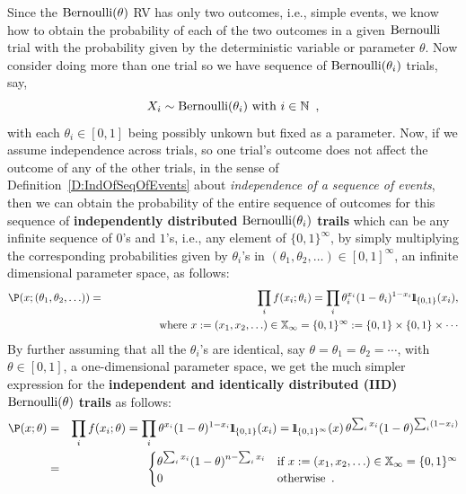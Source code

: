 Since the $\mbox{{\rm Bernoulli}}(\theta)$ RV has only two outcomes, i.e., simple events, we know how to obtain the probability of each of the two outcomes in a given $\mbox{{\rm Bernoulli}}$ trial with the probability given by the deterministic variable or parameter $\theta$. 
Now consider doing more than one trial so we have sequence of $\mbox{{\rm Bernoulli}}(\theta_i)$ trials, say,
\[
X_i \sim \mbox{{\rm Bernoulli}}(\theta_i) \text{ with } i \in \mathbb{N} \enspace ,
\] 
with each $\theta_i \in [0,1]$ being possibly unkown but fixed as a parameter. 
Now, if we assume independence across trials, so one trial's outcome does not affect the outcome of any of the other trials, in the sense of Definition~\ref{D:IndOfSeqOfEvents} 
about \emph{independence of a sequence of events}, then we can obtain the probability of the entire sequence of outcomes for this sequence of \textbf{independently distributed} $\mbox{{\rm Bernoulli}}(\theta_i)$ \textbf{trails} which can be any infinite sequence of $0$'s and $1$'s, i.e., any element of $\{0,1\}^{\infty}$, by simply multiplying the corresponding probabilities given by $\theta_i$'s in $(\theta_1,\theta_2,\ldots) \in [0,1]^{\infty}$, an infinite dimensional parameter space, as follows:
\begin{eqnarray}\label{Eq:probofindependentBernoullithetaiTrials}
\P(x; (\theta_1,\theta_2,\ldots)) &=& \prod_i f(x_i;\theta_i)= \prod_i \theta_i^{x_i} (1-\theta_i)^{1-x_i} \BB{1}_{\{0,1\}}(x_i), \\
&~& \qquad \qquad \text{ where } x:= (x_1,x_2,\ldots) \in \mathbb{X}_{\infty} = \{0,1\}^{\infty} := \{0,1\} \times \{0,1\} \times \cdots \notag
\end{eqnarray}
By further assuming that all the $\theta_i$'s are identical, say $\theta = \theta_1 = \theta_2 = \cdots$, with $\theta \in [0,1]$, a one-dimensional parameter space, we get the much simpler expression for the \textbf{independent and identically distributed (IID)} $\mbox{{\rm Bernoulli}}(\theta)$ \textbf{trails} as follows:
\begin{eqnarray}\label{Eq:probofindependentIdenticalBernoullithetaTrials}
\P(x; \theta) &=& \prod_i f(x_i;\theta)= \prod_i \theta^{x_i} (1-\theta)^{1-x_i} \BB{1}_{\{0,1\}}(x_i) =  \BB{1}_{\{0,1\}^{\infty}}(x) \, \theta^{\sum_i x_i} (1-\theta)^{\sum_i(1-x_i)} \notag\\
&=&  
\begin{cases}
\theta^{\sum_i x_i} (1-\theta)^{n-\sum_i x_i} & \text{if $x:= (x_1,x_2,\ldots) \in \mathbb{X}_{\infty} = \{0,1\}^{\infty}$}\\ 
0 & \text{otherwise}\enspace .
\end{cases}
\end{eqnarray}

